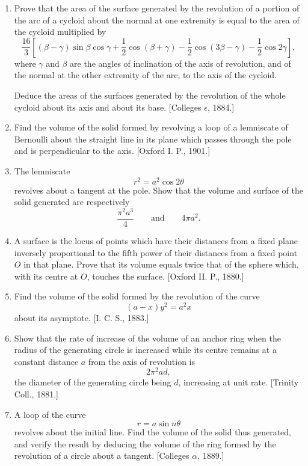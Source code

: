 \documentclass[11pt, a4paper]{article}
\newcommand{\source}[1]{\hfill\textnormal{[#1]}}
\begin{document}
\begin{enumerate}[leftmargin=2em]

\item[10.] Prove that the area of the surface generated by the revolution of a portion of the arc of a cycloid about the normal at one extremity is equal to the area of the cycloid multiplied by
\[
\frac{16}{3}\left[(\beta-\gamma)\sin\beta\cos\gamma
+\frac12\cos(\beta+\gamma)
-\frac12\cos(3\beta-\gamma)
-\frac12\cos 2\gamma\right],
\]
where $\gamma$ and $\beta$ are the angles of inclination of the axis of revolution, and of the normal at the other extremity of the arc, to the axis of the cycloid.

Deduce the areas of the surfaces generated by the revolution of the whole cycloid about its axis and about its base.
\source{Colleges $\epsilon$, 1884.}

\item[11.] Find the volume of the solid formed by revolving a loop of a lemniscate of Bernoulli about the straight line in its plane which passes through the pole and is perpendicular to the axis.
\source{Oxford I. P., 1901.}

\item[12.] The lemniscate
\[
r^2=a^2\cos 2\theta
\]
revolves about a tangent at the pole. Show that the volume and surface of the solid generated are respectively
\[
\frac{\pi^2a^3}{4}
\qquad\text{and}\qquad
4\pi a^2.
\]

\item[13.] A surface is the locus of points which have their distances from a fixed plane inversely proportional to the fifth power of their distances from a fixed point $O$ in that plane. Prove that its volume equals twice that of the sphere which, with its centre at $O$, touches the surface.
\source{Oxford II. P., 1880.}

\item[14.] Find the volume of the solid formed by the revolution of the curve
\[
(a-x)y^2=a^2x
\]
about its asymptote.
\source{I. C. S., 1883.}

\item[15.] Show that the rate of increase of the volume of an anchor ring when the radius of the generating circle is increased while its centre remains at a constant distance $a$ from the axis of revolution is
\[
2\pi^2ad,
\]
the diameter of the generating circle being $d$, increasing at unit rate.
\source{Trinity Coll., 1881.}

\item[16.] A loop of the curve
\[
r=a\sin n\theta
\]
revolves about the initial line. Find the volume of the solid thus generated, and verify the result by deducing the volume of the ring formed by the revolution of a circle about a tangent.
\source{Colleges $\alpha$, 1889.}


\end{enumerate}
\end{document}
